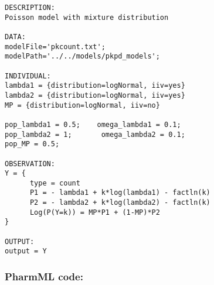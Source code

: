 \lstset{language=MLXTRANcode}
\begin{lstlisting}
DESCRIPTION:
Poisson model with mixture distribution

DATA:
modelFile='pkcount.txt';
modelPath='../../models/pkpd_models';

INDIVIDUAL:
lambda1 = {distribution=logNormal, iiv=yes}
lambda2 = {distribution=logNormal, iiv=yes}
MP = {distribution=logNormal, iiv=no}

pop_lambda1 = 0.5;    omega_lambda1 = 0.1;
pop_lambda2 = 1;       omega_lambda2 = 0.1;
pop_MP = 0.5;

OBSERVATION:
Y = {
      type = count
      P1 = - lambda1 + k*log(lambda1) - factln(k)
      P2 = - lambda2 + k*log(lambda2) - factln(k)
      Log(P(Y=k)) = MP*P1 + (1-MP)*P2
}

OUTPUT: 
output = Y
\end{lstlisting}

\myEndLine

\subsubsection{PharmML code:}

